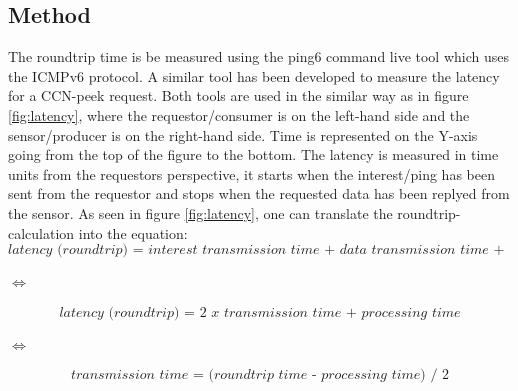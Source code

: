 \subsection{Method}
The roundtrip time is be measured using the ping6 command live tool which uses the ICMPv6 protocol. A similar tool has been developed to measure the latency for a CCN-peek request. Both tools are used in the similar way as in figure \ref{fig:latency}, where the requestor/consumer is on the left-hand side and the sensor/producer is on the right-hand side. Time is represented on the Y-axis going from the top of the figure to the bottom. 
The latency is measured in time units from the requestors perspective, it starts when the interest/ping has been sent from the requestor and stops when the requested data has been replyed from the sensor. As seen in figure \ref{fig:latency}, one can translate the roundtrip-calculation into the equation:
\begin{equation} \label{eq:1}
\textit{latency (roundtrip) = interest transmission time + data transmission time + processing time}
\end{equation}
\begin{center}$\Leftrightarrow$\end{center}
\begin{equation} \label{eq:2}
\textit{latency (roundtrip) = 2 x transmission time + processing time}
\end{equation}
\begin{center}$\Leftrightarrow$\end{center}
\begin{equation} \label{eq:3}
\textit{transmission time = (roundtrip time - processing time) / 2}
\end{equation}\\\\
